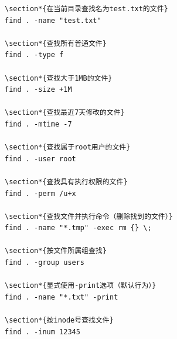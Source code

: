 \documentclass[12pt,UTF8]{ctexbook}
\begin{document}
\begin{verbatim}
\section*{在当前目录查找名为test.txt的文件}
find . -name "test.txt"

\section*{查找所有普通文件}
find . -type f

\section*{查找大于1MB的文件}
find . -size +1M

\section*{查找最近7天修改的文件}
find . -mtime -7

\section*{查找属于root用户的文件}
find . -user root

\section*{查找具有执行权限的文件}
find . -perm /u+x

\section*{查找文件并执行命令（删除找到的文件）}
find . -name "*.tmp" -exec rm {} \;

\section*{按文件所属组查找}
find . -group users

\section*{显式使用-print选项（默认行为）}
find . -name "*.txt" -print

\section*{按inode号查找文件}
find . -inum 12345


\end{verbatim}
\end{document}

